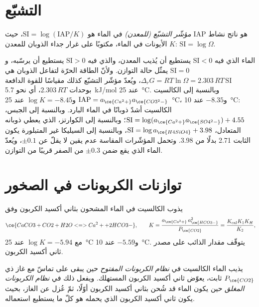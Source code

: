 \section{التشبّع}\label{sec:b3:water-rock-interaction:saturation}

\begin{definition}\label{def:b3:water-rock-interaction:si}
\emph{مؤشّر التشبّع (للمعدن)}
في الماء هو $\mathrm{SI} = \log(\mathrm{IAP}/K)$، حيث IAP هو
ناتج نشاط الأيونات في الماء، مكتوبًا على غرار جداء
الذوبان للمعدن $K$: $\mathrm{SI} = \log\Omega$.
\end{definition}

الماء الذي فيه $\mathrm{SI} < 0$ يستطيع أن يُذيب المعدن، والذي فيه
$\mathrm{SI} > 0$ يستطيع أن يرسّبه، و$\mathrm{SI} = 0$ يمثّل حالة التوازن.
ولأنّ الطاقة الحرّة لتفاعل الذوبان هي $\Delta_r G = RT\ln\Omega
= 2.303\,RT\,\mathrm{SI}$، ويُعدّ مؤشّر التشبّع كذلك مقياسًا
للقوة الدافعة بوحدات $2.303\,RT$، أي نحو \qty{5.7}{kJ/mol} عند
\qty{25}{\celsius}. وبالنسبة إلى الكالسيت $\mathrm{IAP} = a_{\ce{Ca^2+}}
a_{\ce{CO3^2-}}$ و$\log K = -8.45$ عند \qty{25}{\celsius}، و$-8.35$ عند
\qty{10}{\celsius}: الكالسيت أشدّ ذوبانًا في الماء البارد. وبالنسبة إلى الجبس، $\mathrm{SI} = \log(a_{\ce{Ca^2+}}a_{\ce{SO4^2-}}) + 4.55$؛
وبالنسبة إلى الكوارتز، الذي يعطي ذوبانه  المتعادل، $\mathrm{SI} = \log
a_{\ce{H4SiO4}} + 3.98$، وبالنسبة إلى السيليكا غير المتبلورة يكون الثابت 2.71
بدلًا من 3.98. وتحمل المؤشّرات المقاسة عدم يقين لا يقلّ عن $\pm0.1$،
ويُعدّ الماء الذي يقع ضمن $\pm0.3$ من الصفر قريبًا من التوازن.

\section{توازنات الكربونات في الصخور}\label{sec:b3:water-rock-interaction:carbonate}

يذوب الكالسيت في الماء المشحون بثاني أكسيد الكربون وفق
\[
\ce{CaCO3 + CO2 + H2O <=> Ca^2+ + 2 HCO3-},
\qquad K = \frac{a_{\ce{Ca^2+}}\,a_{\ce{HCO3-}}^2}{P_{\ce{CO2}}}
= \frac{K_{\mathrm{cal}}K_1K_H}{K_2},
\]
مع $\log K = -5.94$ عند \qty{25}{\celsius} و$-5.59$ عند \qty{10}{\celsius}.
يتوقّف مقدار الذائب على مصدر ثاني أكسيد الكربون.

\begin{definition}\label{def:b3:water-rock-interaction:open-closed}
يذيب الماء الكالسيت في \emph{نظام الكربونات المفتوح}
حين يبقى على تماسّ مع غاز
ذي $P_{\ce{CO2}}$ ثابت، يعوّض ثاني أكسيد الكربون المستهلك. ويفعل ذلك في
\emph{نظام الكربونات المغلق} حين يكون الماء قد
شُحن بثاني أكسيد الكربون أوّلًا، ثمّ عُزل عن الغاز، بحيث
يكون ثاني أكسيد الكربون الذي يحمله هو كلّ ما يستطيع استعماله.
\end{definition}


